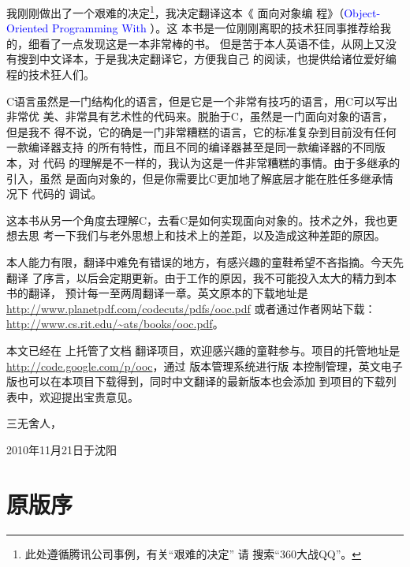 我刚刚做出了一个艰难的决定\footnote{此处遵循腾讯公司事例，有关“艰难的决定”
请 \Google{} 搜索“360大战QQ”。}，我决定翻译这本《 面向对象编
程》（\textcolor{blue}{Object-Oriented Programming With }）。这
本书是一位刚刚离职的技术狂同事推荐给我的，细看了一点发现这是一本非常棒的书。
但是苦于本人英语不佳，从网上又没有搜到中文译本，于是我决定翻译它，方便我自己
的阅读，也提供给诸位爱好编程的技术狂人们。

C语言虽然是一门结构化的语言，但是它是一个非常有技巧的语言，用C可以写出非常优
美、非常具有艺术性的代码来。\cpp 脱胎于C，虽然是一门面向对象的语言，但是我不
得不说，它的确是一门非常糟糕的语言，它的标准复杂到目前没有任何一款编译器支持
\cpp 的所有特性，而且不同的编译器甚至是同一款编译器的不同版本，对 \cpp 代码
的理解是不一样的，我认为这是一件非常糟糕的事情。由于多继承的引入，虽然 \cpp
是面向对象的，但是你需要比C更加地了解底层才能在胜任多继承情况下 \cpp 代码的
调试。

这本书从另一个角度去理解C，去看C是如何实现面向对象的。技术之外，我也更想去思
考一下我们与老外思想上和技术上的差距，以及造成这种差距的原因。

\iffalse
本文通过\LaTeX{}进行排版，由于初次使用\LaTeX{}的Book模板，有些地方做的不
是很好敬请谅解～～
\fi %

本人能力有限，翻译中难免有错误的地方，有感兴趣的童鞋希望不吝指摘。今天先翻译
了序言，以后会定期更新。由于工作的原因，我不可能投入太大的精力到本书的翻译，
预计每一至两周翻译一章。英文原本的下载地址是
\url{http://www.planetpdf.com/codecuts/pdfs/ooc.pdf}
或者通过作者网站下载：\url{http://www.cs.rit.edu/~ats/books/ooc.pdf}。

本文已经在  上托管了文档
翻译项目，欢迎感兴趣的童鞋参与。项目的托管地址是
\url{http://code.google.com/p/ooc}，通过 版本管理系统进行版
本控制管理，英文电子版也可以在本项目下载得到，同时中文翻译的最新版本也会添加
到项目的下载列表中，欢迎提出宝贵意见。

\bigskip
\bigskip

\begin{flushright}
    三无舍人，

    2010年11月21日于沈阳
\end{flushright}


\chapter{原版序}
\label{ch:OrigPreface}

